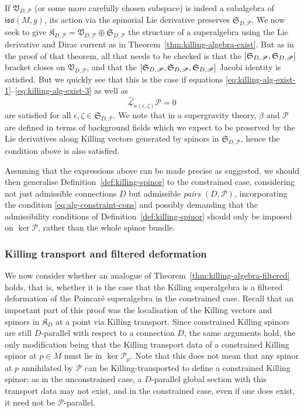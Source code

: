 \documentclass[11pt]{article}
\numberwithin{equation}{section}
\numberwithin{equation}{section}
\newcommand{\fiso}{\mathfrak{iso}}
\newcommand{\fK}{\mathfrak{K}}
\newcommand{\fS}{\mathfrak{S}}
\newcommand{\fV}{\mathfrak{V}}
\newcommand{\eL}{\mathscr{L}}
\newcommand{\eP}{\mathscr{P}}
\newcommand{\eLhat}{\widehat{\eL}}
\newcommand{\1}{\mathbbm{1}}
\begin{document}
If $\fV_{D,\eP}$ (or some more carefully chosen subspace) is indeed a subalgebra of $\fiso(M,g)$, its action via the spinorial Lie derivative preserves $\fS_{D,\eP}$.
We now seek to give $\fK_{D,\eP} = \fV_{D,\eP}\oplus\fS_{D,\eP}$ the structure of a superalgebra using the Lie derivative and Dirac current as in Theorem~\ref{thm:killing-algebra-exist}. But as in the proof of that theorem, all that needs to be checked is that the $\comm{\fS_{D,\eP}}{\fS_{D,\eP}}$ bracket closes on $\fV_{D,\eP}$, and that the $\qty[\fS_{D,\eP},\fS_{D,\eP},\fS_{D,\eP}]$ Jacobi identity is satisfied. But we quickly see that this is the case if equations \eqref{eq:killing-alg-exist-1}--\eqref{eq:killing-alg-exist-3} as well as
\begin{equation}\label{eq:alg-constraint-cons}
	\eLhat_{\kappa(\epsilon,\zeta)}\eP = 0
\end{equation}
are satisfied for all $\epsilon,\zeta\in\fS_{D,\eP}$. We note that in a supergravity theory, $\beta$ and $\eP$ are defined in terms of background fields which we expect to be preserved by the Lie derivatives along Killing vectors generated by spinors in $\fS_{D,\eP}$, hence the condition above is also satisfied.

Assuming that the expressions above can be made precise as suggested, we should then generalise Definition~\ref{def:killing-spinor} to the constrained case, considering not just admissible connections $D$ but admissible \emph{pairs} $(D,\eP)$, incorporating the condition \eqref{eq:alg-constraint-cons} and possibly demanding that the admissibility conditions of Definition~\ref{def:killing-spinor} should only be imposed on $\ker\eP$, rather than the whole spinor bundle.

\subsubsection{Killing transport and filtered deformation}

We now consider whether an analogue of Theorem~\ref{thm:killing-algebra-filtered} holds, that is, whether it is the case that the Killing superalgebra is a filtered deformation of the Poincar\'e superalgebra in the constrained case. Recall that an important part of this proof was the localisation of the Killing vectors and spinors in $\fK_D$ at a point via Killing transport. Since constrained Killing spinors are still $D$-parallel with respect to a connection $D$, the same arguments hold, the only modification being that the Killing transport data of a constrained Killing spinor at $p\in M$ must lie in $\ker\eP_p$. Note that this does not mean that any spinor at $p$ annihilated by $\eP$ can be Killing-transported to define a constrained Killing spinor; as in the unconstrained case, a $D$-parallel global section with this transport data may not exist, and in the constrained case, even if one does exist, it need not be $\eP$-parallel.
\end{document}
